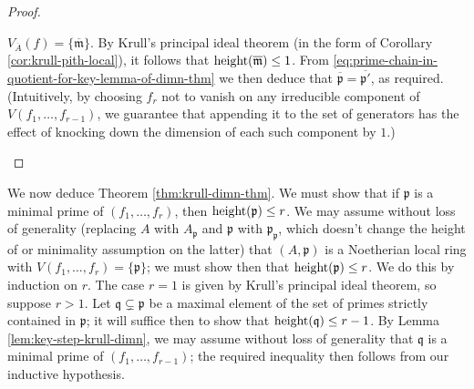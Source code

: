 \documentclass[reqno]{amsart} 
\begin{document}
\begin{proof}
\begin{enumerate}
    $V_{\overline{A}}(f)
    = \{\overline{\mathfrak{m}}\}$.    
    By Krull's principal
    ideal theorem (in the form of Corollary \ref{cor:krull-pith-local}),
    it follows that $\operatorname{height}(\overline{\mathfrak{m} }) \leq 1$.
    From
    \eqref{eq:prime-chain-in-quotient-for-key-lemma-of-dimn-thm}
    we then deduce that $\overline{\mathfrak{p} } =
    \overline{\mathfrak{p}'}$,
    as required.
    (Intuitively, by choosing $f_r$ not to vanish on any irreducible component
    of $V(f_1,\dotsc,f_{r-1})$,
    we guarantee that appending it to the set of generators has the effect
    of knocking down the dimension of each such component by $1$.)
  \end{enumerate}
\end{proof}

We now deduce Theorem \ref{thm:krull-dimn-thm}.  We must show that if \(\mathfrak{p}\) is a minimal prime of \((f_1,\dotsc,f_r)\), then \(\operatorname{height}(\mathfrak{p}) \leq r\).  We may assume without loss of generality (replacing \(A\) with \(A_\mathfrak{p}\) and \(\mathfrak{p}\) with \(\mathfrak{p}_\mathfrak{p}\), which doesn't change the height of or minimality assumption on the latter) that \((A,\mathfrak{p})\) is a Noetherian local ring with \(V(f_1,\dotsc,f_r) = \{\mathfrak{p}\}\); we must show then that \(\operatorname{height}(\mathfrak{p}) \leq r\).  We do this by induction on \(r\).  The case \(r = 1\) is given by Krull's principal ideal theorem, so suppose \(r > 1\).  Let \(\mathfrak{q} \subsetneq \mathfrak{p}\) be a maximal element of the set of primes strictly contained in \(\mathfrak{p}\); it will suffice then to show that \(\operatorname{height}(\mathfrak{q}) \leq r-1\).  By Lemma \ref{lem:key-step-krull-dimn}, we may assume without loss of generality that \(\mathfrak{q}\) is a minimal prime of \((f_1,\dotsc,f_{r-1})\); the required inequality then follows from our inductive hypothesis.

{} 
\end{document}

